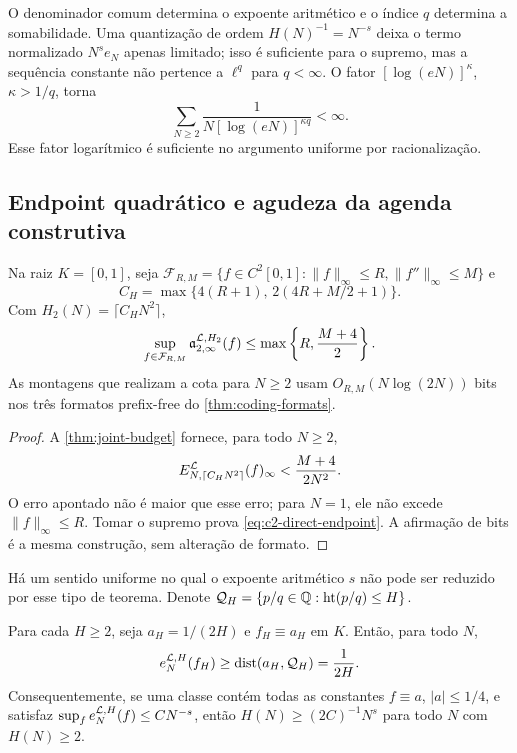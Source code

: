 \begin{remark}
\label{rem:q-height-role}
O denominador comum determina o expoente aritmético e o índice $q$ determina
a somabilidade. Uma quantização de ordem
$H(N)^{-1}=N^{-s}$ deixa o termo normalizado $N^se_N$ apenas limitado; isso
é suficiente para o supremo, mas a sequência constante não pertence a
$\ell^q$ para $q<\infty$. O fator $[\log(eN)]^\kappa$, $\kappa>1/q$, torna
\[
 \sum_{N\ge2}\frac1{N[\log(eN)]^{\kappa q}}<\infty.
\]
Esse fator logarítmico é suficiente no argumento uniforme por
racionalização.
\end{remark}

\subsection{Endpoint quadrático e agudeza da agenda construtiva}

\begin{corollary}[endpoint $C^2$]
\label{cor:c2-direct-endpoint}
Na raiz $K=[0,1]$, seja
$\mathcal F_{R,M}=\{f\in C^2[0,1]:\|f\|_\infty\le R,
\|f''\|_\infty\le M\}$ e
\[
 C_H=\max\{4(R+1),\,2(4R+M/2+1)\}.
\]
Com $H_2(N)=\lceil C_HN^2\rceil$,
\begin{equation}
 \sup_{f\in\mathcal F_{R,M}}
 \mathfrak a_{2,\infty}^{\mathcal{L},H_2}(f)
 \le\max\left\{R,\frac{M+4}{2}\right\}.
 \label{eq:c2-direct-endpoint}
\end{equation}
As montagens que realizam a cota para $N\ge2$ usam
$O_{R,M}(N\log(2N))$ bits nos três formatos prefix-free do
\cref{thm:coding-formats}.
\end{corollary}

\begin{proof}
A \cref{thm:joint-budget} fornece, para todo $N\ge2$,
\[
 E_{N,\lceil C_HN^2\rceil}^{\mathcal{L}}(f)_\infty
 <\frac{M+4}{2N^2}.
\]
O erro apontado não é maior que esse erro; para $N=1$, ele não excede
$\|f\|_\infty\le R$. Tomar o supremo prova
\eqref{eq:c2-direct-endpoint}. A afirmação de bits é a mesma construção,
sem alteração de formato.
\end{proof}

Há um sentido uniforme no qual o expoente aritmético $s$ não pode ser
reduzido por esse tipo de teorema. Denote
$\mathcal Q_H=\{p/q\in\mathbb Q:\operatorname{ht}(p/q)\le H\}$.

\begin{proposition}
\label{prop:arithmetic-floor}
Para cada $H\ge2$, seja $a_H=1/(2H)$ e $f_H\equiv a_H$ em $K$. Então, para
todo $N$,
\begin{equation}
 e_N^{\mathcal{L},H}(f_H)
 \ge\operatorname{dist}(a_H,\mathcal Q_H)
 =\frac1{2H}.
 \label{eq:arithmetic-floor}
\end{equation}
Consequentemente, se uma classe contém todas as constantes
$f\equiv a$, $|a|\le1/4$, e satisfaz
$\sup_f e_N^{\mathcal{L},H}(f)\le C N^{-s}$, então
$H(N)\ge(2C)^{-1}N^s$ para todo $N$ com $H(N)\ge2$.
\end{proposition}

